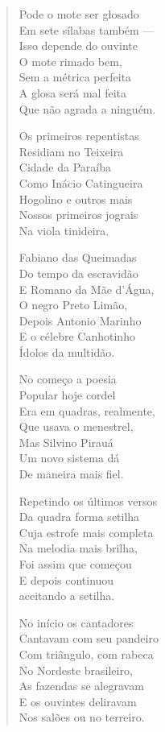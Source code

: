 \begin{verse}
Pode o mote ser glosado \\
Em sete sílabas também ---\\
Isso depende do ouvinte \\
O mote rimado bem, \\
Sem a métrica perfeita \\
A glosa será mal feita \\
Que não agrada a ninguém. 


Os primeiros repentistas \\
Residiam no Teixeira \\
Cidade da Paraíba \\
Como Inácio Catingueira \\
Hogolino e outros mais \\
Nossos primeiros jograis \\
Na viola tinideira. 

Fabiano das Queimadas \\
Do tempo da escravidão \\
E Romano da Mãe d'Água, \\
O negro Preto Limão, \\
Depois Antonio Marinho \\
E o célebre Canhotinho \\
Ídolos da multidão. 

No começo a poesia \\
Popular hoje cordel \\
Era em quadras, realmente, \\
Que usava o menestrel, \\
Mas Silvino Pirauá \\
Um novo sistema dá \\
De maneira mais fiel. 

Repetindo os últimos versos \\
Da quadra forma setilha \\
Cuja estrofe mais completa \\
Na melodia mais brilha, \\
Foi assim que começou \\
E depois continuou \\
aceitando a setilha. 


No início os cantadores \\
Cantavam com seu pandeiro \\
Com triângulo, com rabeca \\
No Nordeste brasileiro, \\
As fazendas se alegravam \\
E os ouvintes deliravam \\
Nos salões ou no terreiro. 


\end{verse}
